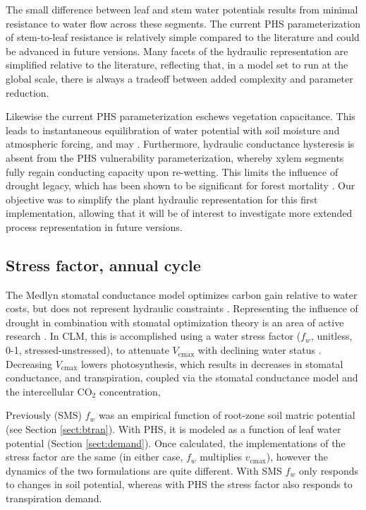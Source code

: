 \documentclass[draft,linenumbers]{agujournal}
\begin{document}
The small difference between leaf and stem water potentials results from minimal resistance to water flow across these segments. 
The current PHS parameterization of stem-to-leaf resistance is relatively simple compared to the literature \citep{franks2007} and could be advanced in future versions. 
Many facets of the hydraulic representation are simplified relative to the literature, reflecting that, in a model set to run at the global scale, 
there is always a tradeoff between added complexity and parameter reduction.

Likewise the current PHS parameterization eschews vegetation capacitance. 
This leads to instantaneous equilibration of water potential with soil moisture and atmospheric forcing, and may .
Furthermore, hydraulic conductance hysteresis is absent from the PHS vulnerability parameterization, 
whereby xylem segments fully regain conducting capacity upon re-wetting.
This limits the influence of drought legacy, which has been shown to be significant for forest mortality \citep{anderegg2013}.
Our objective was to simplify the plant hydraulic representation for this first implementation, 
allowing that it will be of interest to investigate more extended process representation in future versions.

\subsection{Stress factor, annual cycle}

The Medlyn stomatal conductance model optimizes carbon gain relative to water costs, but does not represent hydraulic constraints \citep{medlyn2011}.
Representing the influence of drought in combination with stomatal optimization theory is an area of active research \citep{zhou2013,novick2016a}.
In CLM, this is accomplished using a water stress factor ($f_w$, unitless, 0-1, stressed-unstressed), to attenuate $V_{\text{cmax}}$ with declining water status \citep{oleson2013}. 
Decreasing $V_{\text{cmax}}$ lowers photosynthesis, which results in decreases in stomatal conductance, and transpiration, 
coupled via the stomatal conductance model and the intercellular CO$_2$ concentration, 

Previously (SMS) $f_w$ was an empirical function of root-zone soil matric potential (see Section \ref{sect:btran}).
With PHS, it is modeled as a function of leaf water potential (Section \ref{sect:demand}).
Once calculated, the implementations of the stress factor are the same (in either case, $f_w$ multiplies $v_{\text{cmax}}$),
however the dynamics of the two formulations are quite different.
With SMS $f_w$ only responds to changes in soil potential,
whereas with PHS the stress factor also responds to transpiration demand.
\end{document}
